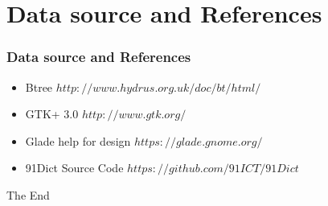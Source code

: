 
\section{Data source and References}
\begin{frame}
\frametitle{Data source and References}
\begin{itemize}
  \item Btree $http://www.hydrus.org.uk/doc/bt/html/$
  \item GTK+ 3.0 $http://www.gtk.org/$
  \item Glade help for design $https://glade.gnome.org/$
  \item 91Dict Source Code $https://github.com/91ICT/91Dict$
\end{itemize}
\end{frame}

\begin{frame}
\Huge{\centerline{The End}}
\end{frame}
